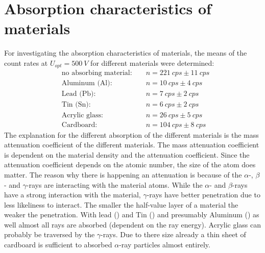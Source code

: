 \section{Absorption characteristics of materials}
%
For investigating the absorption characteristics of materials, the means of the count rates at
\(U_{opt}=\SI{500}{V}\) for different materials were determined:
%
\begin{align}
&\text{no absorbing material: }  &&n = \SI{221}{cps} \pm \SI{11}{cps}\\
&\text{Aluminum (Al): }          &&n = \SI{10}{cps} \pm \SI{4}{cps}\\
&\text{Lead (Pb): }              &&n = \SI{7}{cps} \pm \SI{2}{cps}\\
&\text{Tin (Sn): }               &&n = \SI{6}{cps} \pm \SI{2}{cps}\\
&\text{Acrylic glass: }          &&n = \SI{26}{cps} \pm \SI{5}{cps}\\
&\text{Cardboard: }              &&n = \SI{104}{cps} \pm \SI{8}{cps}
\end{align}
%
The explanation for the different absorption of the different materials is the mass attenuation coefficient of the
different materials. The mass attenuation coefficient is dependent on the material density and the attenuation
coefficient. Since the attenuation coefficient depends on the atomic number, the size of the atom does
matter. The reason why there is happening an attenuation is because of the \(\alpha\)-, \(\beta\)- and \(\gamma\)-rays are
interacting with the material atoms. While the \(\alpha\)- and \(\beta\)-rays have a strong interaction with the material,
\(\gamma\)-rays have better penetration due to less likeliness to interact. The smaller the half-value layer of a
material the weaker the penetration. With lead () and Tin () and presumably Aluminum
() as well almost all rays are absorbed (dependent on the ray energy). Acrylic glass can probably be
traversed by the \(\gamma\)-rays. Due to there size already a thin sheet of cardboard is sufficient to absorbed
\(\alpha\)-ray particles almost entirely.
%
